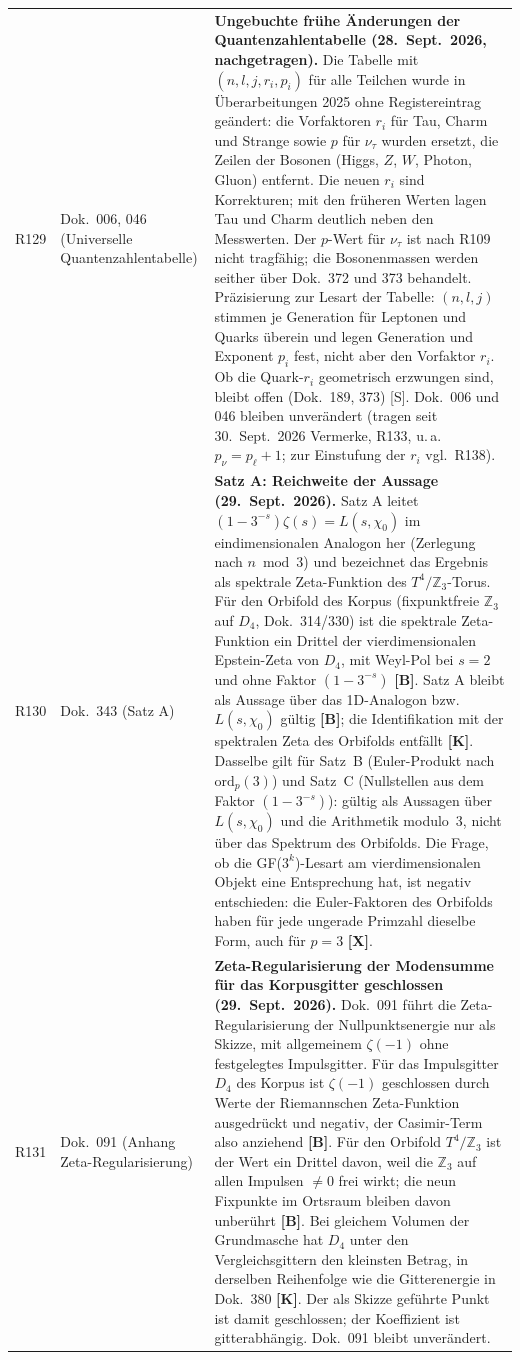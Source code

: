 \begin{longtable}{@{}p{0.9cm}p{3.1cm}p{10.2cm}@{}}
R129 & Dok.~006, 046 (Universelle Quantenzahlentabelle) & \textbf{Ungebuchte frühe Änderungen der Quantenzahlentabelle (28.~Sept.~2026, nachgetragen).} Die Tabelle mit $(n,l,j,r_i,p_i)$ für alle Teilchen wurde in Überarbeitungen 2025 ohne Registereintrag geändert: die Vorfaktoren $r_i$ für Tau, Charm und Strange sowie $p$ für $\nu_\tau$ wurden ersetzt, die Zeilen der Bosonen (Higgs, $Z$, $W$, Photon, Gluon) entfernt. Die neuen $r_i$ sind Korrekturen; mit den früheren Werten lagen Tau und Charm deutlich neben den Messwerten. Der $p$-Wert für $\nu_\tau$ ist nach R109 nicht tragfähig; die Bosonenmassen werden seither über Dok.~372 und 373 behandelt. Präzisierung zur Lesart der Tabelle: $(n,l,j)$ stimmen je Generation für Leptonen und Quarks überein und legen Generation und Exponent $p_i$ fest, nicht aber den Vorfaktor $r_i$. Ob die Quark-$r_i$ geometrisch erzwungen sind, bleibt offen (Dok.~189, 373) [S]. Dok.~006 und 046 bleiben unverändert (tragen seit 30.~Sept.~2026 Vermerke, R133, u.\,a.\ $p_\nu=p_\ell+1$; zur Einstufung der $r_i$ vgl.\ R138). \\
R130 & Dok.~343 (Satz A) & \textbf{Satz A: Reichweite der Aussage (29.~Sept.~2026).} Satz A leitet $(1-3^{-s})\zeta(s)=L(s,\chi_0)$ im eindimensionalen Analogon her (Zerlegung nach $n \bmod 3$) und bezeichnet das Ergebnis als spektrale Zeta-Funktion des $T^4/\mathbb{Z}_3$-Torus. Für den Orbifold des Korpus (fixpunktfreie $\mathbb{Z}_3$ auf $D_4$, Dok.~314/330) ist die spektrale Zeta-Funktion ein Drittel der vierdimensionalen Epstein-Zeta von $D_4$, mit Weyl-Pol bei $s=2$ und ohne Faktor $(1-3^{-s})$ \textbf{[B]}. Satz A bleibt als Aussage über das 1D-Analogon bzw.\ $L(s,\chi_0)$ gültig \textbf{[B]}; die Identifikation mit der spektralen Zeta des Orbifolds entfällt \textbf{[K]}. Dasselbe gilt für Satz~B (Euler-Produkt nach $\mathrm{ord}_p(3)$) und Satz~C (Nullstellen aus dem Faktor $(1-3^{-s})$): gültig als Aussagen über $L(s,\chi_0)$ und die Arithmetik modulo~3, nicht über das Spektrum des Orbifolds. Die Frage, ob die GF($3^k$)-Lesart am vierdimensionalen Objekt eine Entsprechung hat, ist negativ entschieden: die Euler-Faktoren des Orbifolds haben für jede ungerade Primzahl dieselbe Form, auch für $p=3$ \textbf{[X]}. \\
R131 & Dok.~091 (Anhang Zeta-Regularisierung) & \textbf{Zeta-Regularisierung der Modensumme für das Korpusgitter geschlossen (29.~Sept.~2026).} Dok.~091 führt die Zeta-Regularisierung der Nullpunktsenergie nur als Skizze, mit allgemeinem $\zeta(-1)$ ohne festgelegtes Impulsgitter. Für das Impulsgitter $D_4$ des Korpus ist $\zeta(-1)$ geschlossen durch Werte der Riemannschen Zeta-Funktion ausgedrückt und negativ, der Casimir-Term also anziehend \textbf{[B]}. Für den Orbifold $T^4/\mathbb{Z}_3$ ist der Wert ein Drittel davon, weil die $\mathbb{Z}_3$ auf allen Impulsen $\neq0$ frei wirkt; die neun Fixpunkte im Ortsraum bleiben davon unberührt \textbf{[B]}. Bei gleichem Volumen der Grundmasche hat $D_4$ unter den Vergleichsgittern den kleinsten Betrag, in derselben Reihenfolge wie die Gitterenergie in Dok.~380 \textbf{[K]}. Der als Skizze geführte Punkt ist damit geschlossen; der Koeffizient ist gitterabhängig. Dok.~091 bleibt unverändert. \\

\end{longtable}
